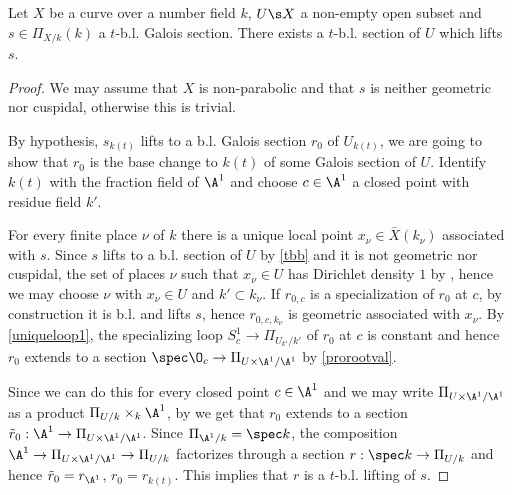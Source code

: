 
\begin{lemma}
\notready\label{nflift}
	Let $X$ be a curve over a number field $k$, $U\s X$ a non-empty open subset and $s\in\Pi_{X/k}(k)$ a $t$-b.l. Galois section. There exists a $t$-b.l. section of $U$ which lifts $s$.
	\begin{proof}
		We may assume that $X$ is non-parabolic and that $s$ is neither geometric nor cuspidal, otherwise this is trivial.

		By hypothesis, $s_{k(t)}$ lifts to a b.l. Galois section $r_{0}$ of $U_{k(t)}$, we are going to show that $r_{0}$ is the base change to $k(t)$ of some Galois section of $U$. Identify $k(t)$ with the fraction field of $\A^{1}$ and choose $c\in \A^{1}$ a closed point with residue field $k'$.

        For every finite place $\nu$ of $k$ there is a unique local point $x_{\nu}\in\bar{X}(k_{\nu})$ associated with $s$. Since $s$ lifts to a b.l. section of $U$ by \autoref{tbb} and it is not geometric nor cuspidal, the set of places $\nu$ such that $x_{\nu}\in U$ has Dirichlet density $1$ by \cite[Theorem B]{sti15}, hence we may choose $\nu$ with $x_{\nu}\in U$ and $k'\subset k_{\nu}$. If $r_{0,c}$ is a specialization of $r_{0}$ at $c$, by construction it is b.l. and lifts $s$, hence $r_{0,c,k_{\nu}}$ is geometric associated with $x_{\nu}$. By \autoref{uniqueloop1}, the specializing loop $S^{1}_{c}\to\Pi_{U_{k'}/k'}$ of $r_{0}$ at $c$ is constant and hence $r_{0}$ extends to a section $\spec\O_{c}\to\Pi_{U\times\A^{1}/\A^{1}}$ by \autoref{prorootval}.

		Since we can do this for every closed point $c\in\A^{1}$ and we may write $\Pi_{U\times\A^{1}/\A^{1}}$ as a product $\Pi_{U/k}\times_{k}\A^{1}$, by \cite[Corollary A.3]{fed} we get that $r_{0}$ extends to a section $\tilde{r}_{0}:\A^{1}\to\Pi_{U\times\A^{1}/\A^{1}}$. Since $\Pi_{\A^{1}/k}=\spec k$, the composition $\A^{1}\to\Pi_{U\times\A^{1}/\A^{1}}\to\Pi_{U/k}$ factorizes through a section $r:\spec k\to\Pi_{U/k}$ and hence $\tilde{r}_{0}=r_{\A^{1}}$, $r_{0}=r_{k(t)}$. This implies that $r$ is a $t$-b.l. lifting of $s$.
	\end{proof}
\end{lemma}
